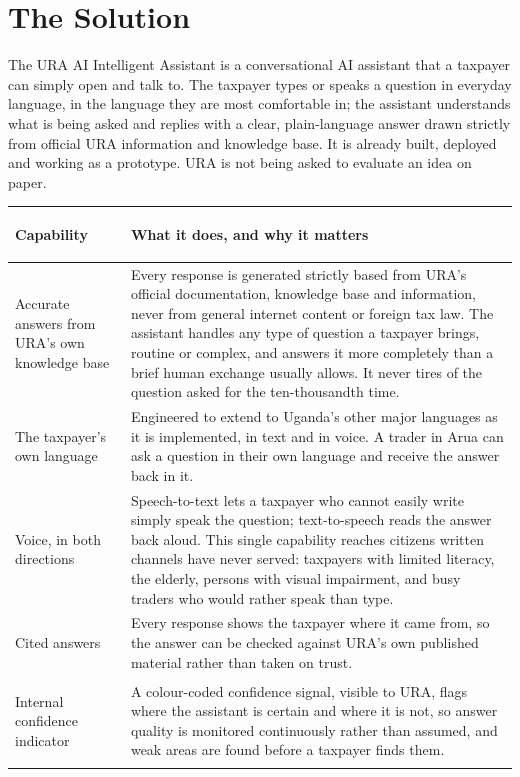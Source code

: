 \documentclass[11pt,a4paper]{article}
\begin{document}
\section{The Solution}

The URA AI Intelligent Assistant is a conversational AI assistant that a taxpayer can simply open and talk to. The taxpayer types or speaks a question in everyday language, in the language they are most comfortable in; the assistant understands what is being asked and replies with a clear, plain-language answer drawn strictly from official URA information and knowledge base. It is already built, deployed and working as a prototype. URA is not being asked to evaluate an idea on paper.

\begin{longtable}{@{}>{\bfseries\raggedright}p{4cm} p{10.7cm}@{}}
\toprule
\textbf{Capability} & \textbf{What it does, and why it matters} \\
\midrule
\endhead
Accurate answers from URA's own knowledge base &
Every response is generated strictly based from URA's official documentation, knowledge base and information, never from general internet content or foreign tax law. The assistant handles any type of question a taxpayer brings, routine or complex, and answers it more completely than a brief human exchange usually allows. It never tires of the question asked for the ten-thousandth time. \\[0.6em]

The taxpayer's own language &
Engineered to extend to Uganda's other major languages as it is implemented, in text and in voice. A trader in Arua can ask a question in their own language and receive the answer back in it. \\[0.6em]

Voice, in both directions &
Speech-to-text lets a taxpayer who cannot easily write simply speak the question; text-to-speech reads the answer back aloud. This single capability reaches citizens written channels have never served: taxpayers with limited literacy, the elderly, persons with visual impairment, and busy traders who would rather speak than type. \\[0.6em]

Cited answers &
Every response shows the taxpayer where it came from, so the answer can be checked against URA's own published material rather than taken on trust. \\[0.6em]

Internal confidence indicator &
A colour-coded confidence signal, visible to URA, flags where the assistant is certain and where it is not, so answer quality is monitored continuously rather than assumed, and weak areas are found before a taxpayer finds them. \\[0.6em]


\end{longtable}
\end{document}
